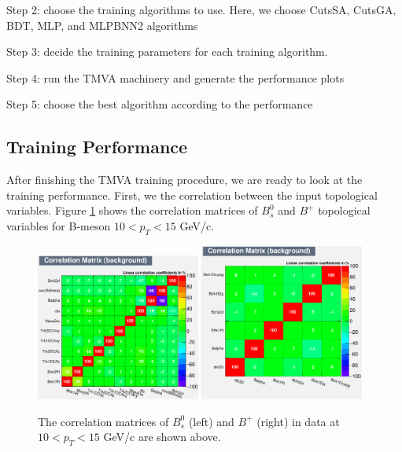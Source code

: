Step 2: choose the training algorithms to use. Here, we choose CutsSA, CutsGA, BDT, MLP, and MLPBNN2 algorithms

Step 3: decide the training parameters for each training algorithm. 

Step 4: run the TMVA machinery and generate the performance plots 

Step 5: choose the best algorithm according to the performance


\subsection{Training Performance}

After finishing the TMVA training procedure, we are ready to look at the training performance. First, we the correlation between the input topological variables. Figure \ref{CorrMatrix} shows the correlation matrices of $B^0_s$ and $B^+$ topological variables for B-meson $10 < p_T < 15$ GeV/c.

\begin{figure}[h]
\begin{center}
\includegraphics[width= 0.48\textwidth]{Figures/Chapter5/BsCorr_10_15.eps}
\includegraphics[width= 0.48\textwidth]{Figures/Chapter5/BPCorr_10_15.pdf}
\caption{The correlation matrices of $B^0_s$ (left) and $B^+$ (right) in data at $10 < p_T < 15$ GeV/c are shown above.}
\label{CorrMatrix}
\end{center}
\end{figure}

